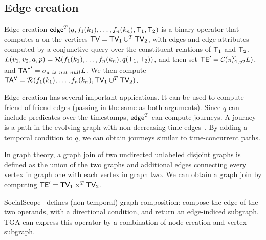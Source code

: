 \subsection{Edge creation}
\label{sec:algebra:ecreate}

Edge creation
$\textsf{edge}^T(q,f_1(k_1),\ldots,f_n(k_n),\mathsf{T}_1,\mathsf{T}_2)$ is a binary
operator that computes a \tg on the vertices $\textsf{TV} = \textsf{TV}_1 \cup^T
\textsf{TV}_2$, with edges and edge attributes computed by a conjunctive query
over the constituent relations of $\mathsf{T}_1$ and $\mathsf{T}_2$.  
$L(v_1,v_2,a,p) = \mathcal{R}(f_1(k_1),\ldots,f_n(k_n),q(\mathsf{T}_1,
  \mathsf{T}_2))$, and then set $\textsf{TE}' = \mathcal{C}(\pi^T_{v1,v2} L)$, and $\mathsf{TA^{E}}'
= \sigma_{a~is~not~null} L$.  We then compute $\mathsf{TA^{V}} =
\mathcal{R}(f_1(k_1),\ldots,f_n(k_n),\textsf{TV}_1 \cup^T \textsf{TV}_2)$.


Edge creation has several important applications.  It can be used to
compute friend-of-friend edges (passing in the same \tg as both
arguments).  Since $q$ can include predicates over the timestamps,
$\textsf{edge}^T$ can compute journeys.  A journey is a path in the
evolving graph with non-decreasing time
edges~\cite{Casteigts2011,Ferreira2004}.  By adding a temporal
condition to $q$, we can obtain journeys similar to time-concurrent
paths.

In graph theory, a graph join of two undirected unlabeled disjoint
graphs is defined as the union of the two graphs and additional edges
connecting every vertex in graph one with each vertex in graph two.
We can obtain a graph join by computing $\textsf{TE}' = \textsf{TV}_1 \times^T \textsf{TV}_2$.

SocialScope~\cite{Amer-Yahia2009} defines (non-temporal) graph
composition: compose the edge of the two operands, with a directional
condition, and return an edge-indiced subgraph.  TGA can express this
operator by a combination of node creation and vertex subgraph.

